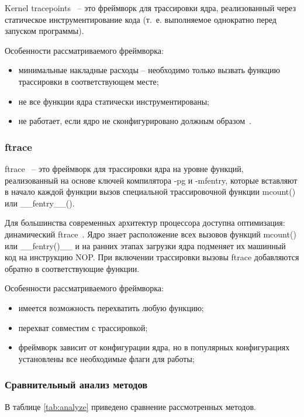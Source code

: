 Kernel tracepoints~\cite{kernel-tracepoints} -- это фреймворк для трассировки ядра, реализованный через статическое инструментирование кода (т.~е. выполняемое однократно перед запуском программы).

Особенности рассматриваемого фреймворка:

\begin{itemize}
	\item минимальные накладные расходы -- необходимо только вызвать функцию трассировки в соответствующем месте;
	\item не все функции ядра статически инструментированы; 
	\item не работает, если ядро не сконфигурировано должным образом~\cite{habr-profiling-linux}.
\end{itemize}

\subsubsection{ftrace}

ftrace~\cite{ftrace} -- это фреймворк для трассировки ядра на уровне функций, реализованный на основе ключей компилятора -pg и -mfentry, которые вставляют в начало каждой функции вызов специальной трассировочной функции mcount() или \_\_fentry\_\_().

Для большинства современных архитектур процессора доступна оптимизация: динамический ftrace~\cite{ftrace-habr}. Ядро знает расположение всех вызовов функций mcount() или \_\_fentry()\_\_ и на ранних этапах загрузки ядра подменяет их машинный код на инструкцию NOP. При включении трассировки вызовы ftrace добавляются обратно в соответствующие функции.

Особенности рассматриваемого фреймворка:

\begin{itemize}
	\item имеется возможность перехватить любую функцию;
	\item перехват совместим с трассировкой;
	\item фреймворк зависит от конфигурации ядра, но в популярных конфигурациях установлены все необходимые флаги для работы; 
\end{itemize}

\subsubsection{Сравнительный анализ методов}

В таблице \ref{tab:analyze} приведено сравнение рассмотренных методов.

